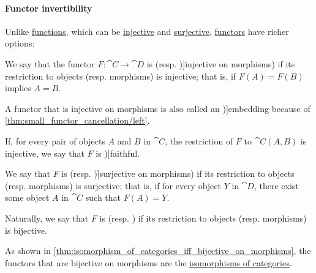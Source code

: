 \paragraph{Functor invertibility}

\begin{definition}\label{def:functor_invertibility}
  Unlike \hyperref[def:function]{functions}, which can be \hyperref[def:function_invertibility/injective]{injective} and \hyperref[def:function_invertibility/injective]{surjective}, \hyperref[def:functor]{functors} have richer options:
  \begin{thmenum}
     We say that the functor \( F: \cat{C} \to \cat{D} \) is  (resp. \term[en=injective on arrows (\cite[def. 7.1]{Awodey2010CategoryTheory})]{injective on morphisms}) if its restriction to objects (resp. morphisms) is injective; that is, if \( F(A) = F(B) \) implies \( A = B \).

    A functor that is injective on morphisms is also called an \term[en=embedding (\cite[def. 4.1.3]{Schubert1972Categories})]{embedding} because of \cref{thm:small_functor_cancellation/left}.

     If, for every pair of objects \( A \) and \( B \) in \( \cat{C} \), the restriction of \( F \) to \( \cat{C}(A, B) \) is injective, we say that \( F \) is \term[ru=унивалентный (функтор) (\cite[132]{ЦаленкоШульгейфер1974ОсновыТеорииКатегорий})]{faithful}.

     We say that \( F \) is  (resp. \term[en=surjective on arrows (\cite[def. 7.1]{Awodey2010CategoryTheory})]{surjective on morphisms}) if its restriction to objects (resp. morphisms) is surjective; that is, if for every object \( Y \) in \( \cat{D} \), there exist some object \( A \) in \( \cat{C} \) such that \( F(A) = Y \).

    \mimprovised Naturally, we say that \( F \) is  (resp. ) if its restriction to objects (resp. morphisms) is bijective.

    As shown in \cref{thm:isomorphism_of_categories_iff_bijective_on_morphisms}, the functors that are bijective on morphisms are the \hyperref[def:isomorphism_of_categories]{isomorphisms of categories}.


\end{thmenum}
\end{definition}
